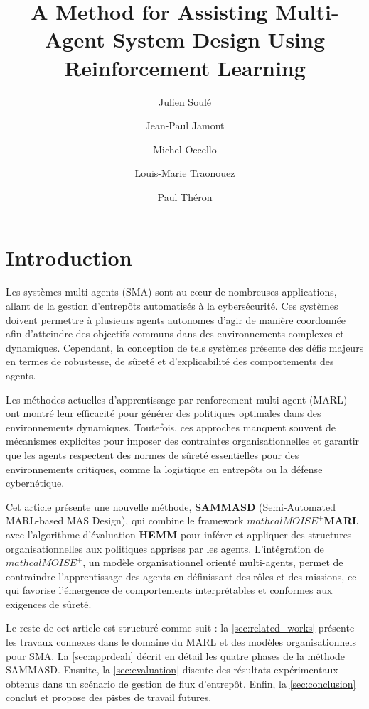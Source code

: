 \documentclass[sigconf,anonymous]{aamas}
\title[AAMAS-2025 CybMASDE]{A Method for Assisting Multi-Agent System Design Using Reinforcement Learning}
\author{Julien Soulé}
\affiliation{
  \institution{Univ. Grenoble Alpes}
  \city{Valence}
  \country{France}}
\author{Jean-Paul Jamont}
\affiliation{
  \institution{Univ. Grenoble Alpes}
  \city{Valence}
  \country{France}}
\author{Michel Occello}
\affiliation{
  \institution{Univ. Grenoble Alpes}
  \city{Valence}
  \country{France}}
\author{Louis-Marie Traonouez}
\affiliation{
  \institution{Thales Land and Air Systems, BU IAS}
  \city{Rennes}
  \country{France}}
\author{Paul Théron}
\affiliation{
  \institution{AICA IWG}
  \city{La Guillermie}
  \country{France}}
\begin{document}

\pagestyle{fancy}
\fancyhead{}


\maketitle


\section{Introduction}

Les systèmes multi-agents (SMA) sont au cœur de nombreuses applications, allant de la gestion d'entrepôts automatisés à la cybersécurité. Ces systèmes doivent permettre à plusieurs agents autonomes d'agir de manière coordonnée afin d'atteindre des objectifs communs dans des environnements complexes et dynamiques. Cependant, la conception de tels systèmes présente des défis majeurs en termes de robustesse, de sûreté et d'explicabilité des comportements des agents.

Les méthodes actuelles d'apprentissage par renforcement multi-agent (MARL) ont montré leur efficacité pour générer des politiques optimales dans des environnements dynamiques. Toutefois, ces approches manquent souvent de mécanismes explicites pour imposer des contraintes organisationnelles et garantir que les agents respectent des normes de sûreté essentielles pour des environnements critiques, comme la logistique en entrepôts ou la défense cybernétique.

Cet article présente une nouvelle méthode, \textbf{SAMMASD} (Semi-Automated MARL-based MAS Design), qui combine le framework \textbf{$mathcal{M}OISE^+$MARL} avec l'algorithme d'évaluation \textbf{HEMM} pour inférer et appliquer des structures organisationnelles aux politiques apprises par les agents. L'intégration de \textbf{$mathcal{M}OISE^+$}, un modèle organisationnel orienté multi-agents, permet de contraindre l'apprentissage des agents en définissant des rôles et des missions, ce qui favorise l'émergence de comportements interprétables et conformes aux exigences de sûreté.

Le reste de cet article est structuré comme suit : la \autoref{sec:related_works} présente les travaux connexes dans le domaine du MARL et des modèles organisationnels pour SMA. La \autoref{sec:apprdeah} décrit en détail les quatre phases de la méthode SAMMASD. Ensuite, la \autoref{sec:evaluation} discute des résultats expérimentaux obtenus dans un scénario de gestion de flux d'entrepôt. Enfin, la \autoref{sec:conclusion} conclut et propose des pistes de travail futures.
\end{document}
